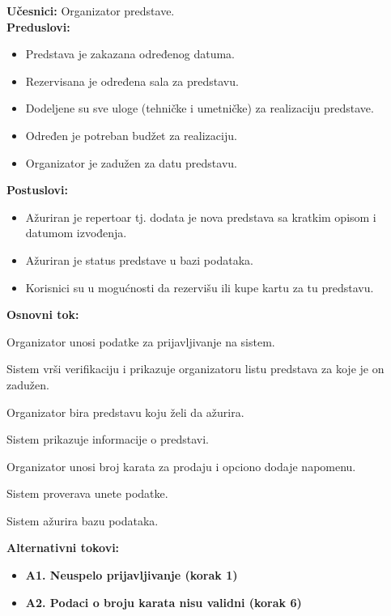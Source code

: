 \documentclass[a4paper]{article}
\begin{document}
\noindent\textbf{Učesnici:} Organizator predstave.\\

\noindent\textbf{Preduslovi:}
  \begin{itemize}
    \item Predstava je zakazana određenog datuma.
    \item Rezervisana je određena sala za predstavu.
    \item Dodeljene su sve uloge (tehničke i umetničke) za realizaciju predstave.
    \item Određen je potreban budžet za realizaciju.
    \item Organizator je zadužen za datu predstavu.
  \end{itemize}

\noindent\textbf{Postuslovi:} 
  \begin{itemize}
    \item Ažuriran je repertoar tj. dodata je nova predstava sa kratkim opisom i datumom izvođenja.
    \item Ažuriran je status predstave u bazi podataka.
    \item Korisnici su u mogućnosti da rezervišu ili kupe kartu za tu predstavu.
  \end{itemize}

\noindent\textbf{Osnovni tok:}
  \begin{legal}
    \item Organizator unosi podatke za prijavljivanje na sistem.
    \item Sistem vrši verifikaciju i prikazuje organizatoru listu predstava za koje je on zadužen.
    \item Organizator bira predstavu koju želi da ažurira.
    \item Sistem prikazuje informacije o predstavi.
    \item Organizator unosi broj karata za prodaju i opciono dodaje napomenu.
    \item Sistem proverava unete podatke.
    \item Sistem ažurira bazu podataka.
  \end{legal}

\noindent\textbf{Alternativni tokovi:} 
\begin{itemize}
  \item \textbf{A1. Neuspelo prijavljivanje (korak 1)} 
  \item \textbf{A2. Podaci o broju karata nisu validni (korak 6)} 
\end{itemize}
\end{document}
